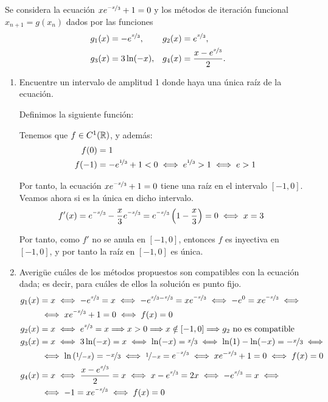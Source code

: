 \begin{ejercicio}\label{ej:1.1.13}
    Se considera la ecuación $xe^{\nicefrac{-x}{3}} + 1 = 0$ y los métodos de iteración funcional $x_{n+1} = g(x_n)$ dados por las funciones
    \begin{align*}
        g_1(x) &= -e^{\nicefrac{x}{3}}, & g_2(x) &= e^{\nicefrac{x}{3}}, \\
        g_3(x) &= 3\ln(-x), & g_4(x) &= \dfrac{x-e^{\nicefrac{x}{3}}}{2}.
    \end{align*}
    \begin{enumerate}
        \item Encuentre un intervalo de amplitud 1 donde haya una única raíz de la ecuación.
        
        Definimos la siguiente función:

        Tenemos que $f\in C^1(\mathbb{R})$, y además:
        \begin{align*}
            f(0)&=1\\
            f(-1)&=-e^{\nicefrac{1}{3}}+1<0\iff e^{\nicefrac{1}{3}}>1\iff e>1
        \end{align*}

        Por tanto, la ecuación $xe^{\nicefrac{-x}{3}} + 1 = 0$ tiene una raíz en el intervalo $[-1,0]$. Veamos ahora si es la única en dicho intervalo.
        \begin{align*}
            f'(x)&=e^{\nicefrac{-x}{3}}-\dfrac{x}{3}e^{\nicefrac{-x}{3}}=e^{\nicefrac{-x}{3}}\left(1-\dfrac{x}{3}\right)=0\iff x=3
        \end{align*}

        Por tanto, como $f'$ no se anula en $[-1,0]$, entonces $f$ es inyectiva en $[-1,0]$, y por tanto la raíz en $[-1,0]$ es única.
        \item Averigüe cuáles de los métodos propuestos son compatibles con la ecuación dada; es decir, para cuáles de ellos la solución es punto fijo.
        \begin{align*}
            g_1(x)&=x\iff -e^{\nicefrac{x}{3}}=x\iff -e^{\nicefrac{x}{3}-\nicefrac{x}{3}}=xe^{\nicefrac{-x}{3}}\iff -e^0=xe^{\nicefrac{-x}{3}}\iff\\&\iff xe^{\nicefrac{-x}{3}}+1=0\iff f(x)=0\\
            g_2(x)&=x\iff e^{\nicefrac{x}{3}}=x\Longrightarrow x>0\Longrightarrow x\notin [-1,0]\Longrightarrow g_2\text{ no es compatible}\\
            g_3(x)&=x\iff 3\ln(-x)=x\iff \ln(-x)=\nicefrac{x}{3}\iff \ln(1)-\ln(-x)=-\nicefrac{x}{3}\iff\\&\iff \ln\left(\nicefrac{1}{-x}\right)=\nicefrac{-x}{3}\iff \nicefrac{1}{-x}=e^{\nicefrac{-x}{3}}\iff xe^{-\nicefrac{x}{3}}+1=0\iff f(x)=0\\
            g_4(x)&=x\iff \dfrac{x-e^{\nicefrac{x}{3}}}{2}=x\iff x-e^{\nicefrac{x}{3}}=2x\iff -e^{\nicefrac{x}{3}}=x\iff\\&\iff -1=xe^{\nicefrac{-x}{3}}\iff f(x)=0
        \end{align*}


\end{enumerate}
\end{ejercicio}
